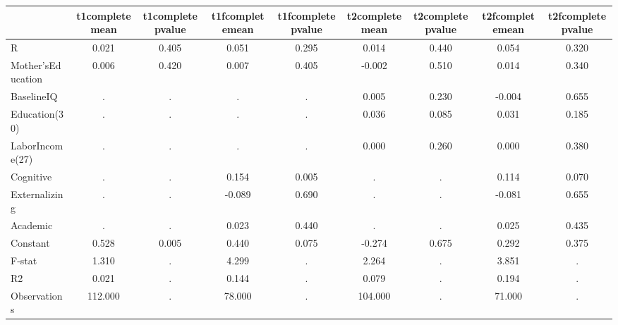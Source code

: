\begin{table}[htbp]
\begin{tabular}{lcccccccc} \hline \hline
 & t1completemean  & t1completepvalue  & t1fcompletemean  & t1fcompletepvalue  & t2completemean  & t2completepvalue  & t2fcompletemean  & t2fcompletepvalue  \\  \hline 
R &     0.021 &     0.405 &     0.051 &     0.295 &     0.014 &     0.440 &     0.054 &     0.320 \\  
Mother'sEducation &     0.006 &     0.420 &     0.007 &     0.405 &    -0.002 &     0.510 &     0.014 &     0.340 \\  
BaselineIQ &         . &         . &         . &         . &     0.005 &     0.230 &    -0.004 &     0.655 \\  
Education(30) &         . &         . &         . &         . &     0.036 &     0.085 &     0.031 &     0.185 \\  
LaborIncome(27) &         . &         . &         . &         . &     0.000 &     0.260 &     0.000 &     0.380 \\  
Cognitive &         . &         . &     0.154 &     0.005 &         . &         . &     0.114 &     0.070 \\  
Externalizing &         . &         . &    -0.089 &     0.690 &         . &         . &    -0.081 &     0.655 \\  
Academic &         . &         . &     0.023 &     0.440 &         . &         . &     0.025 &     0.435 \\  
Constant &     0.528 &     0.005 &     0.440 &     0.075 &    -0.274 &     0.675 &     0.292 &     0.375 \\  
F-stat &     1.310 &         . &     4.299 &         . &     2.264 &         . &     3.851 &         . \\  
R2 &     0.021 &         . &     0.144 &         . &     0.079 &         . &     0.194 &         . \\  
Observations &   112.000 &         . &    78.000 &         . &   104.000 &         . &    71.000 &         . \\  
\hline \hline \end{tabular}
\end{table}
